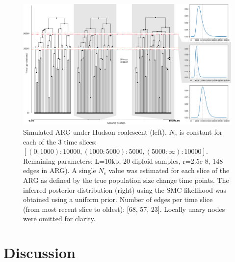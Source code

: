 \documentclass{article}
\begin{document}

\begin{figure}[!ht]
\centering
\includegraphics[width=\textwidth]{figures/3-slices-whitespace.png}
\caption{Simulated ARG under Hudson coalescent (left). $N_e$ is constant for each of the 3 time slices: $[(0:1000): 10 000, (1000:5000): 5000, (5000:\infty):10 000]$. Remaining parameters: L=10kb, 20 diploid samples, r=2.5e-8, 148 edges in ARG). A single $N_e$ value was estimated for each slice of the ARG as defined by the true population size change time points. The inferred posterior distribution (right) using the SMC-likelihood was obtained using a uniform prior. Number of edges per time slice (from most recent slice to oldest): [68, 57, 23]. Locally unary nodes were omitted for clarity.}
\label{fig:3-arg-slices}
\end{figure}

\section{Discussion}
\end{document}
